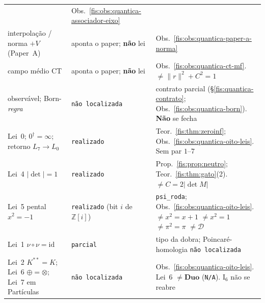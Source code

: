 \documentclass[livro.tex]{subfiles}
\begin{document}
\begin{center}
\begin{tabular}{@{}>{\raggedright\arraybackslash}p{}
                >{\raggedright\arraybackslash}p{}
                >{\raggedright\arraybackslash}p{}@{}}
  & Obs.~\ref{fis:obs:quantica-associador-eixo} \\
interpolação / norma \(+V\)
(Paper~A)
  & aponta o paper;
    \textbf{não} lei
  & Obs.~\ref{fis:obs:quantica-paper-a-norma} \\
campo médio CT
  & aponta o paper;
    \textbf{não} lei
  & Obs.~\ref{fis:obs:quantica-ct-mf}.
    \(\neq\lVert r\rVert^{2}+C^{2}=1\) \\
observável;
Born-\emph{regra}
  & \texttt{não localizada}
  & contrato parcial
    (§\ref{fis:quantica-contrato};
    Obs.~\ref{fis:obs:quantica-born}).
    \textbf{Não} se fecha \\
Lei~0; \(0^{\dagger}=\infty\);
retorno \(L_7\to L_0\)
  & \texttt{realizado}
  & Teor.~\ref{fis:thm:zeroinf};
    Obs.~\ref{fis:obs:quantica-oito-leis}.
    Sem par \(1\)--\(7\) \\
Lei~4 \(\lvert\det\rvert=1\)
  & \texttt{realizado}
  & Prop.~\ref{fis:prop:neutro};
    Teor.~\ref{fis:thm:gato}(2).
    \(\neq C=2\lvert\det M\rvert\) \\
Lei~5 pental \(x^{2}=-1\)
  & \texttt{realizado}
    (bit \(i\) de \(\mathbb{Z}[i]\))
  & \texttt{psi\_roda};
    Obs.~\ref{fis:obs:quantica-oito-leis}.
    \(\neq x^{2}=x+1\)
    \(\neq x^{2}=1\)
    \(\neq\pi^{2}=\pi\)
    \(\neq\mathcal{D}\) \\
Lei~1 \(\nu\circ\nu=\mathrm{id}\)
  & \texttt{parcial}
  & tipo da dobra;
    Poincaré-homologia
    \texttt{não localizada} \\
Lei~2 \(K^{**}=K\);
Lei~6 \(\oplus=\otimes\);
Lei~7 em Partículas
  & \texttt{não localizada}
  & Obs.~\ref{fis:obs:quantica-oito-leis}.
    Lei~6 \(\neq\mathbf{Duo}\)
    (\texttt{N/A}).
    \(\mathrm{I}_{6}\) não se reabre \\
\bottomrule
\end{tabular}
\end{center}
\end{document}
